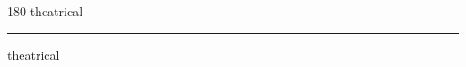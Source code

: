 
\begin{frame}
\begin{center}
\begin{turn}{180}
{\fontsize{2.5cm}{1em}\selectfont theatrical}
\end{turn}
\vspace{1em}\par  
\hrule
\vspace{1em}\par  
{\fontsize{2.5cm}{1em}\selectfont theatrical}
\end{center}
\end{frame}
